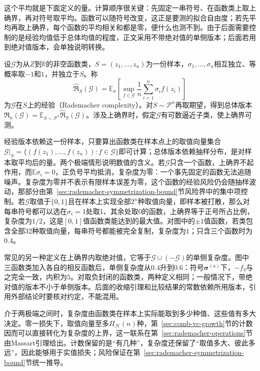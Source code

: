 这个平均就是下面定义的量。计算顺序很关键：先固定一串符号、在函数类上取上确界，再对符号取平均。函数可以随符号改变，这正是要测的拟合自由度；若先平均再取上确界，每个函数的平均相关和都是零，便什么也测不到。由于后面需要控制的是经验均值低于总体均值的程度，正文采用不带绝对值的单侧版本；后面若用到绝对值版本，会单独说明转换。

\begin{definition}[Rademacher复杂度]
\label{def:learning-rademacher-complexity}
设$\mathcal G$为从$Z$到$\mathbb R$的非空函数类，$S=(z_1,\ldots,z_n)$为一份样本，$\sigma_1,\ldots,\sigma_n$相互独立、等概率取$-1$和$1$，并独立于$S$。称
\begin{equation}
 \widehat{\mathfrak R}_S(\mathcal G)
 =\mathbb E_\sigma\left[\sup_{f\in\mathcal G}
       \frac1n\sum_{i=1}^n\sigma_i f(z_i)\right]
 \label{eq:learning-empirical-rademacher}
\end{equation}
为$\mathcal G$在$S$上的经验（Rademacher complexity）。对$S\sim\mathcal P^n$再取期望，得到总体版本$\mathfrak R_n(\mathcal G)=\mathbb E_{S\sim\mathcal P^n}\widehat{\mathfrak R}_S(\mathcal G)$。涉及上确界时，假定$\mathcal G$有可数逼近子类，使上确界可测。
\end{definition}

经验版本依赖这一份样本，只要算出函数类在样本点上的取值向量集合$\mathcal G|_S=\{(f(z_1),\ldots,f(z_n)):f\in\mathcal G\}$即可计算；总体版本依赖抽样分布，是对样本取平均后的量。两个极端情形说明数值的含义。若$\mathcal G$只含一个函数，上确界不起作用，而$\mathbb E\sigma_i=0$，正负号平均抵消，复杂度为零：一个事先固定的函数无法追随噪声。复杂度为零并不表示有限样本误差为零，这个函数的经验风险仍会随抽样波动，那部分由第~\ref{sec:rademacher-symmetrization-bound}节风险界中的集中项控制。若$\mathcal G$取值于$\{0,1\}$且在样本上实现全部$2^n$种取值向量，即样本被打散，那么对每串符号都可以选在$\sigma_i=1$处取1、其余处取0的函数，上确界等于正号所占比例，复杂度为$1/2$，这是$[0,1]$值函数类能达到的最大值。对图中的$\pm1$值函数，若类包含全部32种取值向量，每串符号都能被完全复制，复杂度为$1$；只含三个函数时为$0.4$。

常见的另一种定义在上确界内取绝对值，它等于$\mathcal G\cup(-\mathcal G)$的单侧复杂度。图中三函数类加入各自的相反函数后，单侧复杂度从$0.4$升到$0.6$：符号$\bm\sigma^{(a)}$下，$-f_3$与之完全一致，内积为$5$。对取负封闭的函数类，两种定义相同；一般情况下，带绝对值的版本不小于单侧版本。后面的收缩引理和比较结果的常数依赖所用版本，引用外部结论时要核对约定，不能混用。

介于两极端之间时，复杂度由函数类在样本上实际能取到多少种值、这些值有多大决定。零一损失下，取值向量至多$\Pi_{\mathcal H}(n)$种，第~\ref{sec:comb-vc-growth}节的计数因而可以直接转化为复杂度的上界，这一联系在第~\ref{sec:rademacher-operations}节由Massart引理给出。计数保留的是“有几种”，复杂度还保留了“取值多大、彼此多远”，因此能够用于实值损失；风险保证在第~\ref{sec:rademacher-symmetrization-bound}节统一推导。
